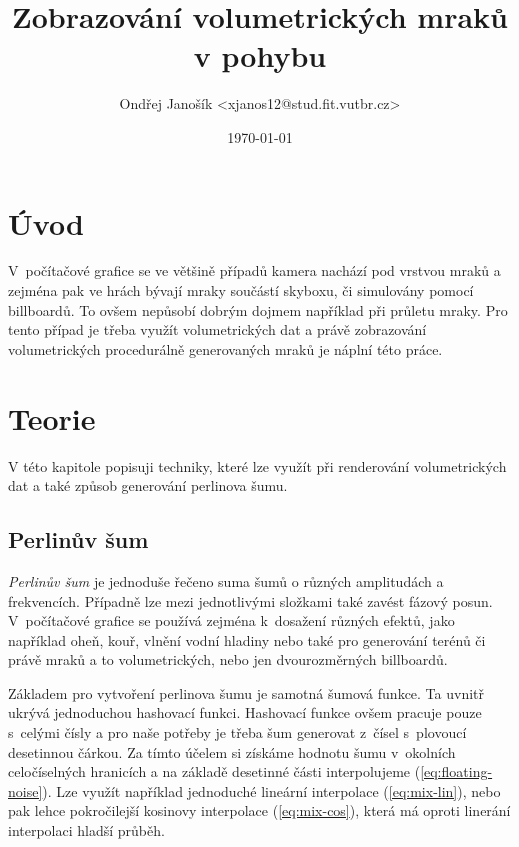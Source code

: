 \documentclass[a4paper, 12pt]{article}
\title{Zobrazování volumetrických mraků v pohybu}
\author{Ondřej Janošík <xjanos12@stud.fit.vutbr.cz>}
\date{\today}
\begin{document}
\maketitle

\section{Úvod}

V~počítačové grafice se ve většině případů kamera nachází pod vrstvou mraků
a zejména pak ve hrách bývají mraky součástí skyboxu,
či simulovány pomocí billboardů. To ovšem nepůsobí dobrým dojmem například
při průletu mraky. Pro tento případ je třeba využít volumetrických dat a právě
zobrazování volumetrických procedurálně generovaných mraků je náplní této práce.


\section{Teorie}

V této kapitole popisuji techniky, které lze využít při renderování
volumetrických dat a také způsob generování perlinova šumu.

\subsection{Perlinův šum}

\textit{Perlinův šum} je jednoduše řečeno suma šumů o různých amplitudách
a frekvencích.
Případně lze mezi jednotlivými složkami také zavést fázový posun.
V~počítačové grafice se používá zejména k~dosažení různých efektů,
jako například oheň, kouř, vlnění vodní hladiny nebo také pro generování
terénů či právě mraků a to volumetrických, nebo jen dvourozměrných billboardů.
\cite{url:wiki-perlin-noise}


Základem pro vytvoření perlinova šumu je samotná šumová funkce.
Ta uvnitř ukrývá jednoduchou hashovací funkci.
Hashovací funkce ovšem pracuje pouze s~celými čísly a pro naše potřeby je třeba
šum generovat z~čísel s~plovoucí desetinnou čárkou. Za tímto účelem si získáme
hodnotu šumu v~okolních celočíselných hranicích a na základě desetinné části
interpolujeme (\ref{eq:floating-noise}).
Lze využít například jednoduché lineární interpolace (\ref{eq:mix-lin}),
nebo pak lehce pokročilejší kosinovy interpolace (\ref{eq:mix-cos}), která
má oproti linerání interpolaci hladší průběh. \cite{url:elias-perlin-noise}
\end{document}
